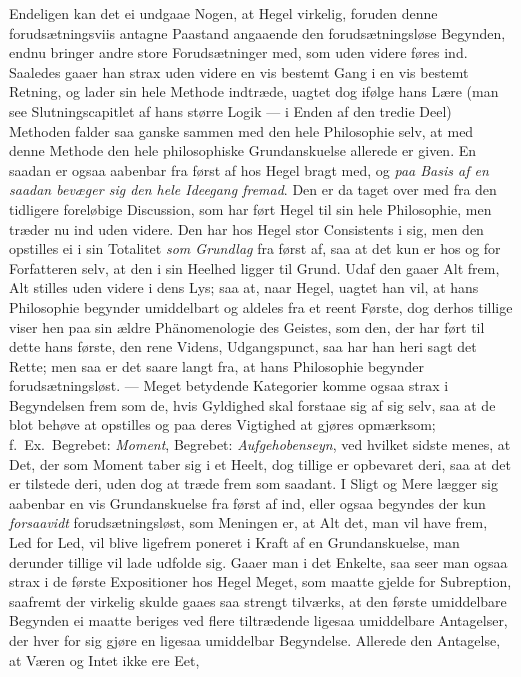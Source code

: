 \documentclass[12pt,a4paper]{book}
\newcommand{\apage}[1]{\marginnote{\footnotesize\textit{[#1]}}}
\begin{document}
Endeligen kan det ei undgaae Nogen, at Hegel virkelig, foruden denne
forudsætningsviis antagne Paastand angaaende den forudsætningsløse
Begynden, endnu bringer andre store Forudsætninger med, som uden
videre føres ind. Saaledes gaaer han strax uden videre en vis bestemt
Gang i en vis bestemt Retning, og lader sin hele Methode indtræde,
uagtet dog ifølge hans Lære (man see Slutningscapitlet af hans større
Logik --- i Enden af den tredie Deel) Methoden falder saa ganske
sammen med den hele Philosophie selv, at med denne Methode den hele
philosophiske Grundanskuelse allerede er given. En saadan er ogsaa
aabenbar fra først af hos Hegel bragt med, og \emph{paa Basis af en saadan
bevæger sig den hele Ideegang fremad}. Den er da taget over med fra den
tidligere foreløbige Discussion, som har ført Hegel til sin hele
Philosophie, men træder nu ind uden videre. Den har hos Hegel stor
Consistents i sig, men den opstilles ei i sin Totalitet \emph{som Grundlag}
fra først af, saa at det kun er hos og for Forfatteren selv, at den i
sin Heelhed ligger til Grund. \apage{35} Udaf den gaaer Alt frem, Alt stilles
uden videre i dens Lys; saa at, naar Hegel, uagtet han vil, at hans
Philosophie begynder umiddelbart og aldeles fra et reent Første, dog
derhos tillige viser hen paa sin ældre Phänomenologie des Geistes, som
den, der har ført til dette hans første, den rene Videns, Udgangspunct,
saa har han heri sagt det Rette; men saa er det saare langt fra, at
hans Philosophie begynder forudsætningsløst. --- Meget betydende
Kategorier komme ogsaa strax i Begyndelsen frem som de, hvis Gyldighed
skal forstaae sig af sig selv, saa at de blot behøve at opstilles og
paa deres Vigtighed at gjøres opmærksom; f.\ Ex.\ Begrebet: \emph{Moment},
Begrebet: \emph{Aufgehobenseyn}, ved hvilket sidste menes, at Det, der som
Moment taber sig i et Heelt, dog tillige er opbevaret deri, saa at det
er tilstede deri, uden dog at træde frem som saadant. I Sligt og Mere
lægger sig aabenbar en vis Grundanskuelse fra først af ind, eller
ogsaa begyndes der kun \emph{forsaavidt} forudsætningsløst, som Meningen er,
at Alt det, man vil have frem, Led for Led, vil blive ligefrem poneret
i Kraft af en Grundanskuelse, man derunder tillige vil lade udfolde
sig. Gaaer man i det Enkelte, saa seer man ogsaa strax i de første
Expositioner hos Hegel Meget, som maatte gjelde for Subreption,
saafremt der virkelig skulde gaaes saa strengt tilværks, at den første
umiddelbare Begynden ei maatte beriges ved flere tiltrædende ligesaa
umiddelbare Antagelser, der hver for sig gjøre en ligesaa umiddelbar
Begyndelse. Allerede den Antagelse, at Væren og Intet ikke ere Eet,
\end{document}

